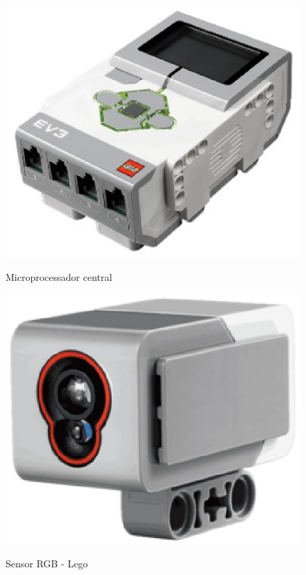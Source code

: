 \begin{figure}[H]
	\centering
	\caption{Microprocessador central}
	\includegraphics[scale=0.6]{figuras/cerebro.eps}
	\label{img:cerebro}
\end{figure}	

\begin{figure}[H]
	\centering
	\caption{Sensor RGB - Lego}
	\includegraphics[scale=0.5]{figuras/sensorLego.eps}
	\label{img:sensorLego}
\end{figure}	

